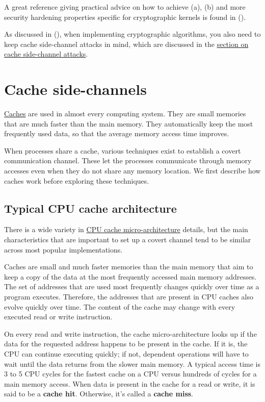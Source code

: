 \documentclass[
  a4paper,
]{report}
\begin{document}
A great reference giving practical advice on how to achieve (a), (b) and
more security hardening properties specific for cryptographic kernels is
found in ().

As discussed in (), when
implementing cryptographic algorithms, you also need to keep cache
side-channel attacks in mind, which are discussed in the
\hyperref[cache-side-channel-attacks]{section on cache side-channel
attacks}.

\section{Cache side-channels}\label{cache-side-channels}

\href{https://en.wikipedia.org/wiki/Cache_(computing)}{\label{__index_entry_105}{Caches}}
are used in almost every computing system. They are small memories that
are much faster than the main memory. They automatically keep the most
frequently used data, so that the average memory access time improves.

When processes share a cache, various techniques exist to establish a
covert communication channel. These let the processes communicate
through memory accesses even when they do not share any memory location.
We first describe how caches work before exploring these techniques.

\subsection{Typical CPU cache
architecture}\label{typical-cpu-cache-architecture}

There is a wide variety in
\href{https://en.wikipedia.org/wiki/CPU_cache}{CPU cache
micro-architecture} details, but the main characteristics that are
important to set up a covert channel tend to be similar across most
popular implementations.

Caches are small and much faster memories than the main memory that aim
to keep a copy of the data at the most frequently accessed main memory
addresses. The set of addresses that are used most frequently changes
quickly over time as a program executes. Therefore, the addresses that
are present in CPU caches also evolve quickly over time. The content of
the cache may change with every executed read or write instruction.

On every read and write instruction, the cache micro-architecture looks
up if the data for the requested address happens to be present in the
cache. If it is, the CPU can continue executing quickly; if not,
dependent operations will have to wait until the data returns from the
slower main memory. A typical
\label{__index_entry_106}{access
time} is 3 to 5 CPU cycles for the fastest
cache on a CPU versus hundreds of cycles for a main memory access. When
data is present in the cache for a read or write, it is said to be a
\textbf{\label{__index_entry_107}{cache
hit}}. Otherwise, it's called a
\textbf{\label{__index_entry_108}{cache
miss}}.
\end{document}
